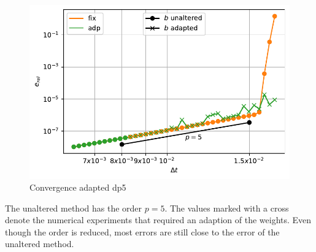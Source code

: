 \documentclass[a4paper]{article}
\numberwithin{equation}{section}
\theoremstyle{plain}
\theoremstyle{definition}
\numberwithin{theorem}{section}
\newcommand{\1}{\mathbbm{1}}
\begin{document}
\begin{figure}[h]
\centering
\includegraphics[scale=0.75]{plots/conv_adde.pdf}
\caption{Convergence adapted dp5}
\label{fig:conv_expl}
\end{figure}

The unaltered method has the order $p=5$. 
The values marked with a cross denote the numerical experiments that required an adaption of the weights. 
Even though the order is reduced, most errors are still close to the error of the unaltered method.
\end{document}
